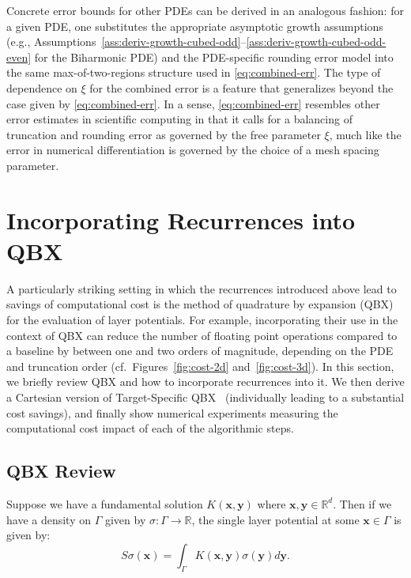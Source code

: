 \documentclass[12pt]{article}
\def\R{{\mathbb R}}
\let\b=\boldsymbol
\theoremstyle{definition}
\theoremstyle{plain}
\theoremstyle{definition}
\begin{document}
Concrete error bounds for other PDEs can be derived in an analogous fashion: for a given PDE, one substitutes the appropriate asymptotic growth assumptions (e.g., Assumptions~\ref{ass:deriv-growth-cubed-odd}--\ref{ass:deriv-growth-cubed-odd-even} for the Biharmonic PDE) and the PDE-specific rounding error model into the same max-of-two-regions structure used in \eqref{eq:combined-err}. The type of dependence on $\xi$ for the combined error is a feature that generalizes beyond the case given by \eqref{eq:combined-err}. In a sense, \eqref{eq:combined-err} resembles other error estimates in scientific computing in that it calls for a balancing of truncation and rounding error as governed by the free parameter $\xi$, much like the error
in numerical differentiation is governed by the choice of a mesh spacing parameter.

\section{Incorporating Recurrences into QBX}
\label{sec:qbx}
A particularly striking setting in which the recurrences introduced above lead to savings of computational cost is the method of quadrature by expansion (QBX) for the evaluation of layer potentials. For example, incorporating their use in the context of QBX can reduce the number of floating point operations compared to a baseline by between one and two orders of magnitude, depending on the PDE and truncation order (cf.~Figures~\ref{fig:cost-2d} and~\ref{fig:cost-3d}). In this section, we briefly review QBX and how to incorporate recurrences into it. We then derive a Cartesian version of Target-Specific QBX~\cite{Siegel_2018} (individually leading to a substantial cost savings), and finally show numerical experiments measuring the computational cost impact of each of the algorithmic steps.

\subsection{QBX Review}
Suppose we have a fundamental solution $K(\b{x}, \b{y})$ where $\b{x} ,\b{y}\in \R^d$. Then if we have a density on $\Gamma$ given by $\sigma:\Gamma\to \mathbb R$, the single layer potential at some $\b{x} \in \Gamma$ is given by:
\begin{equation}
S\sigma(\b{x}) = \int_{\Gamma} K(\b{x}, \b{y})\sigma(\b{y}) d\b{y}.
\end{equation}
\end{document}
